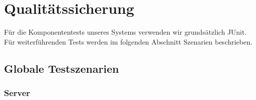\chapter{Qualitätssicherung}
	\label{ch:Qualitaetssicherung}
	
	Für die Komponententests unseres Systems verwenden wir grundsätzlich JUnit. Für weiterführenden Tests werden im folgenden Abschnitt Szenarien beschrieben.
	
\section{Globale Testszenarien}
	\label{ch:Qualitaetssicherung:sec:GlobaleTestszenarien}
	
\subsection{Server}
